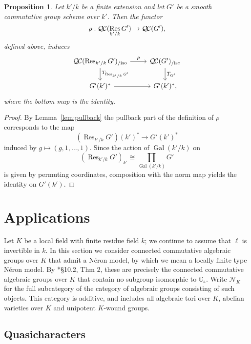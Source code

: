 \documentclass[CM,Submssn,SecEq]{degruyter-crelle} %
\theoremstyle{plain}
\newtheorem{proposition}[theorem]{Proposition}
\theoremstyle{definition}
\theoremstyle{remark}
\newcommand{\Fq}{k}
\DeclareMathOperator{\Gal}{Gal}
\DeclareMathOperator{\Res}{Res}
\newcommand{\TrFrob}[1]{T_{#1}}
\newcommand{\QC}{{\mathcal{Q\hskip-0.8pt C}}}
\newcommand{\QCiso}[1]{\QC(#1)_{/\text{iso}}}
\begin{document}
\begin{proposition}
Let $k'/k$ be a finite extension and let $G'$ be a smooth commutative group scheme over $k'$.
Then the functor 
\[
\rho : \QC(\Res_{k'/k}G') \to \QC(G'),
\]
defined above, induces
\[
\begin{tikzcd}
\QCiso{\Res_{k'/k} G'} \dar{\TrFrob{\Res_{k'/k} G'}} \rar{\rho} & \QCiso{G'} \dar{\TrFrob{G'}}\\
G'(k')^* \rar & G'(k')^*,
\end{tikzcd}
\]
where the bottom map is the identity.
\end{proposition}
\begin{proof}
By Lemma~\ref{lem:pullback} the pullback part of the definition of $\rho$ corresponds to the map
\[
(\Res_{k'/k}G')(k')^* \to G'(k')^*
\]
induced by $g \mapsto (g, 1, \ldots, 1)$.  Since the action of $\Gal(k'/k)$ on
\[
(\Res_{k'/k}G')_{k'} \cong \prod_{\Gal(k'/k)} G'
\]
is given by permuting coordinates, composition with the norm map yields the identity on $G'(k')$.
\end{proof}



\section{Applications}\label{sec:applications}%

Let $K$ be a local field with finite residue field $\Fq$;
 we continue to assume that $\ell$ is invertible in $\Fq$.
In this section we consider connected commutative algebraic groups over $K$ that admit a N\'eron model, by which we mean a locally finite type N\'eron model.
By \cite{bosch-lutkebohmert-reynaud:NeronModels}*{\S 10.2, Thm 2}, these are precisely the connected commutative algebraic groups over $K$ that contain no subgroup isomorphic to $\mathbb{G}_\text{a}$.
Write $\mathcal{N}_K$ for the full subcategory of the category of algebraic groups consisting of such objects.  This category is additive, and includes all algebraic tori over $K$, abelian varieties over $K$ and unipotent $K$-wound groups.

\subsection{Quasicharacters}\label{ssec:quasicharacters}
\end{document}
